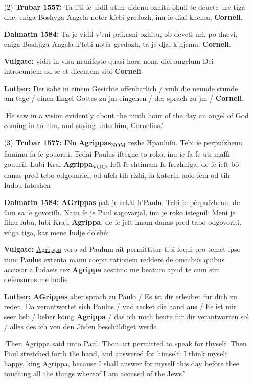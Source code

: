 \documentclass[output=paper,colorlinks,citecolor=brown,arabicfont,chinesefont]{langscibook}
\begin{document}
\begin{itemize}
    \item[(2)] \textbf{Trubar 1557:} Ta iſti ie uidil utim uidenu ozhitu okuli te deuete ure tiga dne, eniga Boshyga Angela noter kſebi gredozh, inu ie dial knemu, \textbf{Corneli}.
    
    \textbf{Dalmatin 1584:} Ta je vidil v'eni prikasni ozhitu, ob deveti uri, po dnevi, eniga Boshjiga Angela k'ſebi notèr gredozh, ta je djal k'njemu: \textbf{Corneli}.
    
    \textbf{Vulgate:} vidit in visu manifeste quasi hora nona diei angelum Dei introeuntem ad se et dicentem sibi \textbf{Corneli}
    
    \textbf{Luther:} Der sahe in einem Gesichte offenbarlich / vmb die neunde stunde am tage / einen Engel Gottes zu jm eingehen / der sprach zu jm / \textbf{Corneli}.
    
    ‘He saw in a vision evidently about the ninth hour of the day an angel of God coming in to him, and saying unto him, Cornelius.’

    \item[(3)] \textbf{Trubar 1577:} INu \textbf{Agrippas}\textsubscript{NOM} rezhe Hpauluſu. Tebi ie perpuſzhenu ſamimu ſa ſe gouoriti. Tedai Paulus iſtegne to roko, inu ie ſa ſe uti maſſi gouuril. Lubi Kral \textbf{Agrippa}\textsubscript{VOC}, Ieſt ſe shtimam ſa ſrezhniga, de ſe ieſt bõ danas pred tebo odgouariel, od uſeh tih rizhi, ſa katerih uolo ſem od tih Iudou ſatoshen
    
    \textbf{Dalmatin 1584:} \textbf{AGrippas} pak je rekàl h'Paulu: Tebi je pèrpuſzhenu, de ſam sa ſe govoriſh. Natu ſe je Paul sagovarjal, inu je roko istegnil: Meni je ſilnu lubu, lubi Krajl \textbf{Agrippa}, de ſe jeſt imam danas pred tabo odgovoriti, vſiga tiga, kar mene Iudje dolshé:
    
    \textbf{Vulgate:} \uline{Agrippa} vero ad Paulum ait permittitur tibi loqui pro temet ipso tunc Paulus extenta manu coepit rationem reddere de omnibus quibus accusor a Iudaeis rex \textbf{Agrippa} aestimo me beatum apud te cum sim defensurus me hodie

    \textbf{Luther:} \textbf{AGrippas} aber sprach zu Paulo / Es ist dir erleubet fur dich zu reden. Da verantwortet sich Paulus / vnd recket die hand aus / Es ist mir seer lieb / lieber könig \textbf{Agrippa} / das ich mich heute fur dir verantworten sol / alles des ich von den Jüden beschüldiget werde

    ‘Then Agrippa said unto Paul, Thou art permitted to speak for thyself. Then Paul stretched forth the hand, and answered for himself: I think myself happy, king Agrippa, because I shall answer for myself this day before thee touching all the things whereof I am accused of the Jews.’
\end{itemize}
\end{document}
